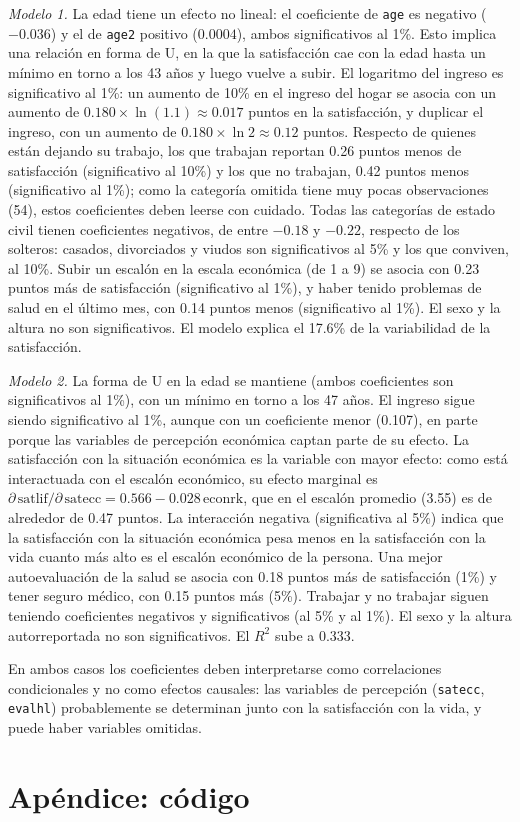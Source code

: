 \documentclass[11pt,a4paper]{article}
\begin{document}
\textit{Modelo 1.} La edad tiene un efecto no lineal: el coeficiente de \texttt{age} es negativo ($-0.036$) y el de \texttt{age2} positivo ($0.0004$), ambos significativos al 1\%. Esto implica una relación en forma de U, en la que la satisfacción cae con la edad hasta un mínimo en torno a los 43 años y luego vuelve a subir. El logaritmo del ingreso es significativo al 1\%: un aumento de 10\% en el ingreso del hogar se asocia con un aumento de $0.180\times\ln(1.1)\approx0.017$ puntos en la satisfacción, y duplicar el ingreso, con un aumento de $0.180\times\ln 2\approx0.12$ puntos. Respecto de quienes están dejando su trabajo, los que trabajan reportan 0.26 puntos menos de satisfacción (significativo al 10\%) y los que no trabajan, 0.42 puntos menos (significativo al 1\%); como la categoría omitida tiene muy pocas observaciones (54), estos coeficientes deben leerse con cuidado. Todas las categorías de estado civil tienen coeficientes negativos, de entre $-0.18$ y $-0.22$, respecto de los solteros: casados, divorciados y viudos son significativos al 5\% y los que conviven, al 10\%. Subir un escalón en la escala económica (de 1 a 9) se asocia con 0.23 puntos más de satisfacción (significativo al 1\%), y haber tenido problemas de salud en el último mes, con 0.14 puntos menos (significativo al 1\%). El sexo y la altura no son significativos. El modelo explica el 17.6\% de la variabilidad de la satisfacción.

\textit{Modelo 2.} La forma de U en la edad se mantiene (ambos coeficientes son significativos al 1\%), con un mínimo en torno a los 47 años. El ingreso sigue siendo significativo al 1\%, aunque con un coeficiente menor (0.107), en parte porque las variables de percepción económica captan parte de su efecto. La satisfacción con la situación económica es la variable con mayor efecto: como está interactuada con el escalón económico, su efecto marginal es $\partial\,\text{satlif}/\partial\,\text{satecc}=0.566-0.028\,\text{econrk}$, que en el escalón promedio (3.55) es de alrededor de 0.47 puntos. La interacción negativa (significativa al 5\%) indica que la satisfacción con la situación económica pesa menos en la satisfacción con la vida cuanto más alto es el escalón económico de la persona. Una mejor autoevaluación de la salud se asocia con 0.18 puntos más de satisfacción (1\%) y tener seguro médico, con 0.15 puntos más (5\%). Trabajar y no trabajar siguen teniendo coeficientes negativos y significativos (al 5\% y al 1\%). El sexo y la altura autorreportada no son significativos. El $R^2$ sube a 0.333.

En ambos casos los coeficientes deben interpretarse como correlaciones condicionales y no como efectos causales: las variables de percepción (\texttt{satecc}, \texttt{evalhl}) probablemente se determinan junto con la satisfacción con la vida, y puede haber variables omitidas.

\newpage
\appendix
\section*{Apéndice: código}

\end{document}
